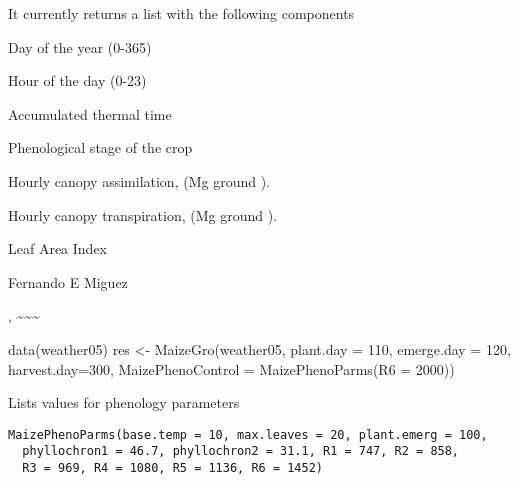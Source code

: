 \documentclass[letterpaper]{book}
\begin{document}
%
\begin{Value}
It currently returns a list with the following components

\begin{ldescription}
\item[\code{DayofYear}] Day of the year (0-365)

\item[\code{Hour}] Hour of the day (0-23)

\item[\code{TTTc}] Accumulated thermal time

\item[\code{PhenoStage}] Phenological stage of the crop

\item[\code{CanopyAssim}] Hourly canopy assimilation, (Mg
 ground ).

\item[\code{CanopyTrans}] Hourly canopy transpiration, (Mg
 ground ).

\item[\code{LAI}] Leaf Area Index
\end{ldescription}
\end{Value}
%
\begin{Author}\relax
Fernando E Miguez
\end{Author}
%
\begin{SeeAlso}\relax
{} 
, \textasciitilde{}\textasciitilde{}\textasciitilde{}
\end{SeeAlso}
%
\begin{Examples}
\begin{ExampleCode}
data(weather05)
res <- MaizeGro(weather05, plant.day = 110, emerge.day = 120, harvest.day=300,
                  MaizePhenoControl = MaizePhenoParms(R6 = 2000))
\end{ExampleCode}
\end{Examples}
%
\begin{Description}\relax
Lists values for phenology parameters
\end{Description}
%
\begin{Usage}
\begin{verbatim}
MaizePhenoParms(base.temp = 10, max.leaves = 20, plant.emerg = 100,
  phyllochron1 = 46.7, phyllochron2 = 31.1, R1 = 747, R2 = 858,
  R3 = 969, R4 = 1080, R5 = 1136, R6 = 1452)
\end{verbatim}
\end{Usage}
\end{document}
